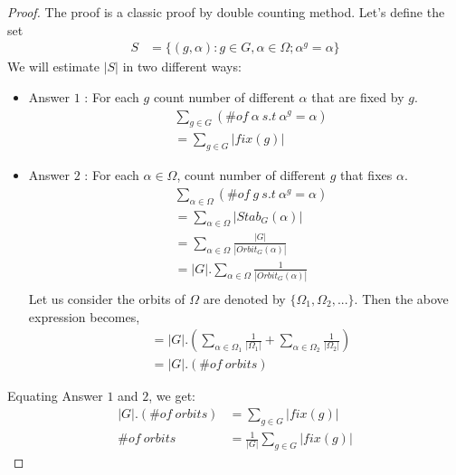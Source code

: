 \begin{proof}
The proof is a classic proof by double counting method. Let's define the set
\begin{align*}
S&=\{(g,\alpha): g\in G, \alpha\in \Omega; \alpha^g=\alpha \}
\end{align*}
We will estimate $|S|$ in two different ways:
\begin{itemize}
\item Answer $1$ : For each $g$ count number of different $\alpha$ that are fixed by $g$.
\begin{align*}
&\sum_{g\in G} (\#of \ \alpha \ s.t \ \alpha^g=\alpha)\\
&=\sum_{g\in G}|fix(g)|
\end{align*}
\item Answer $2$ : For each $\alpha\in \Omega$, count number of different $g$ that fixes $\alpha$.
\begin{align*}
&\sum_{\alpha\in \Omega} (\#of \ g \ s.t \ \alpha^g=\alpha)\\
&=\sum_{\alpha\in \Omega}|Stab_G(\alpha)|\\
&=\sum_{\alpha\in \Omega}\frac{|G|}{|Orbit_G(\alpha)|}\\
&=|G|.\sum_{\alpha\in \Omega}\frac{1}{|Orbit_G(\alpha)|}\\
\end{align*}
Let us consider the orbits of $\Omega$ are denoted by $\{\Omega_1,\Omega_2,...\}$. Then the above expression becomes,
\begin{align*}
&=|G|.(\sum_{\alpha\in \Omega_1}\frac{1}{|\Omega_1|}+\sum_{\alpha\in \Omega_2}\frac{1}{|\Omega_2|} )\\
&=|G|.(\#of \ orbits)
\end{align*}
\end{itemize}
Equating Answer $1$ and $2$, we get:
\begin{align*}
|G|.(\#of \ orbits)&=\sum_{g\in G}|fix(g)|\\
\#of \ orbits&=\frac{1}{|G|}\sum_{g\in G}|fix(g)|
\end{align*}
\end{proof}
